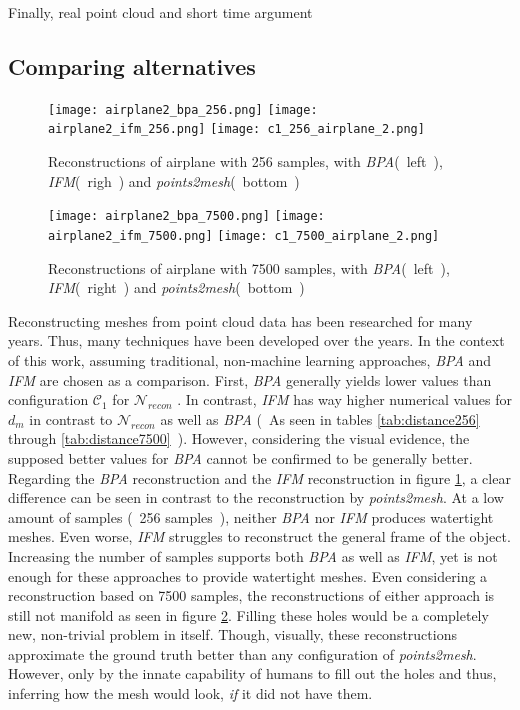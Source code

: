   Finally, real point cloud and short time argument


  \subsection*{Comparing alternatives}


  \begin{figure}[htbp]
    \centering
    \texttt{[image: airplane2\_bpa\_256.png]}
    \texttt{[image: airplane2\_ifm\_256.png]}
    \texttt{[image: c1\_256\_airplane\_2.png]}
    \caption{Reconstructions of airplane with 256 samples, with \emph{BPA}(~left~), \emph{IFM}(~righ~) and \emph{points2mesh}(~bottom~)} \label{fig:bpaifm}
  \end{figure}

  \begin{figure}[htbp]
    \centering
    \texttt{[image: airplane2\_bpa\_7500.png]}
    \texttt{[image: airplane2\_ifm\_7500.png]}
    \texttt{[image: c1\_7500\_airplane\_2.png]}
    \caption{Reconstructions of airplane with 7500 samples, with \emph{BPA}(~left~), \emph{IFM}(~right~) and \emph{points2mesh}(~bottom~)} \label{fig:bpaifmhigh}
  \end{figure}

  Reconstructing meshes from point cloud data has been researched for many years. Thus, many techniques have been developed over the years.
  In the context of this work, assuming traditional, non-machine learning approaches, \emph{BPA} and \emph{IFM} are chosen as a comparison.
  First, \emph{BPA} generally yields lower values than configuration $\mathcal{C}_1$ for $\mathcal{N}_{recon}$ . In contrast, \emph{IFM} has 
  way higher numerical values for $d_m$ in contrast to $\mathcal{N}_{recon}$ as well as \emph{BPA} (~As seen in tables \ref{tab:distance256} through \ref{tab:distance7500}~).
  However, considering the visual evidence, the supposed better values for \emph{BPA} cannot be confirmed to be generally better.
  Regarding the \emph{BPA} reconstruction and the \emph{IFM} reconstruction in figure \ref{fig:bpaifm}, a clear difference
  can be seen in contrast to the reconstruction by \emph{points2mesh}. At a low amount of samples (~256 samples~), 
  neither \emph{BPA} nor \emph{IFM} produces watertight meshes. Even worse, \emph{IFM} struggles to reconstruct the general frame of the object. 
  Increasing the number of samples supports both \emph{BPA} as well as \emph{IFM}, yet is not enough for these approaches to provide watertight meshes.
  Even considering a reconstruction based on 7500 samples, the reconstructions of either approach is still not manifold as seen in figure \ref{fig:bpaifmhigh}.
  Filling these holes would be a completely new, non-trivial problem in itself. Though, visually, these reconstructions approximate the ground truth better 
  than any configuration of \emph{points2mesh}. However, only by the innate capability of humans to fill out the holes and thus, inferring how the mesh would
  look, \emph{if} it did not have them.

